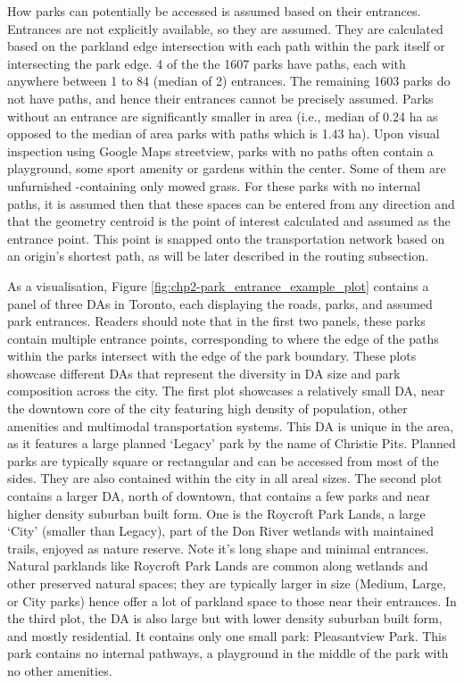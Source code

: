 \documentclass[
11pt, %
oneside, %
english, %
singlespacing, %
]{macthesis} %
\begin{document}
How parks can potentially be accessed is assumed based on their entrances. Entrances are not explicitly available, so they are assumed. They are calculated based on the parkland edge intersection with each path within the park itself or intersecting the park edge. 4 of the the 1607 parks have paths, each with anywhere between 1 to 84 (median of 2) entrances. The remaining 1603 parks do not have paths, and hence their entrances cannot be precisely assumed. Parks without an entrance are significantly smaller in area (i.e., median of 0.24 ha as opposed to the median of area parks with paths which is 1.43 ha). Upon visual inspection using Google Maps streetview, parks with no paths often contain a playground, some sport amenity or gardens within the center. Some of them are unfurnished -containing only mowed grass. For these parks with no internal paths, it is assumed then that these spaces can be entered from any direction and that the geometry centroid is the point of interest calculated and assumed as the entrance point. This point is snapped onto the transportation network based on an origin's shortest path, as will be later described in the routing subsection.

As a visualisation, Figure \ref{fig:chp2-park_entrance_example_plot} contains a panel of three DAs in Toronto, each displaying the roads, parks, and assumed park entrances. Readers should note that in the first two panels, these parks contain multiple entrance points, corresponding to where the edge of the paths within the parks intersect with the edge of the park boundary. These plots showcase different DAs that represent the diversity in DA size and park composition across the city. The first plot showcases a relatively small DA, near the downtown core of the city featuring high density of population, other amenities and multimodal transportation systems. This DA is unique in the area, as it features a large planned `Legacy' park by the name of Christie Pits. Planned parks are typically square or rectangular and can be accessed from most of the sides. They are also contained within the city in all areal sizes. The second plot contains a larger DA, north of downtown, that contains a few parks and near higher density suburban built form. One is the Roycroft Park Lands, a large `City' (smaller than Legacy), part of the Don River wetlands with maintained trails, enjoyed as nature reserve. Note it's long shape and minimal entrances. Natural parklands like Roycroft Park Lands are common along wetlands and other preserved natural spaces; they are typically larger in size (Medium, Large, or City parks) hence offer a lot of parkland space to those near their entrances. In the third plot, the DA is also large but with lower density suburban built form, and mostly residential. It contains only one small park: Pleasantview Park. This park contains no internal pathways, a playground in the middle of the park with no other amenities.
\end{document}
